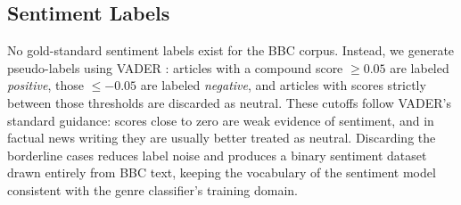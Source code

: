 \subsection{Sentiment Labels}

No gold-standard sentiment labels exist for the BBC corpus. Instead, we generate pseudo-labels using VADER \cite{hutto2014vader}: articles with a compound score $\geq 0.05$ are labeled \textit{positive}, those $\leq -0.05$ are labeled \textit{negative}, and articles with scores strictly between those thresholds are discarded as neutral. These cutoffs follow VADER's standard guidance: scores close to zero are weak evidence of sentiment, and in factual news writing they are usually better treated as neutral. Discarding the borderline cases reduces label noise and produces a binary sentiment dataset drawn entirely from BBC text, keeping the vocabulary of the sentiment model consistent with the genre classifier's training domain.
